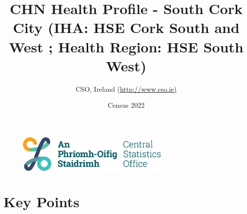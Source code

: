 \documentclass{article}
\title{CHN Health Profile - South Cork City (IHA: HSE Cork South and West ;  Health Region: HSE South West) }
\date{Census 2022}
\author{CSO, Ireland  (\url{http://www.cso.ie)}}
\begin{document}


\begin{figure}
	\centering
\includegraphics[width =75mm]{../figures/CSO_Logo.png}
\end{figure}

				 
		   
						  
														  
																																													
												 
			 
\maketitle
					
													   
				 
						 
																																																																											   
				 
				  
  \pagebreak
    	    \tableofcontents

\pagebreak


\section{Key Points}
\end{document}

